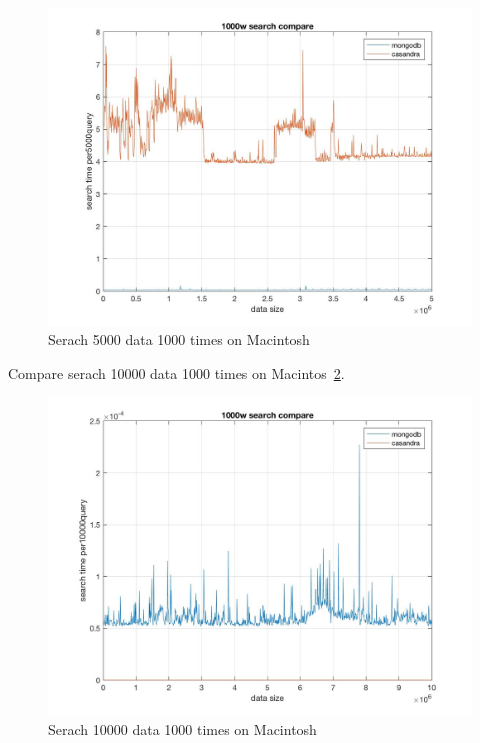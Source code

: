 \begin{figure}[!ht]
  \centering\includegraphics[width=\columnwidth]
  {images/search_comp_5000.jpg}
  \caption{Serach 5000 data 1000 times on Macintosh}\label{f:fly}
\end{figure}

Compare serach 10000 data 1000 times on Macintos~\ref{f:fly}.

\begin{figure}[!ht]
  \centering\includegraphics[width=\columnwidth]
  {images/search_comp_10000.jpg}
  \caption{Serach 10000 data 1000 times on Macintosh}\label{f:fly}
\end{figure}



